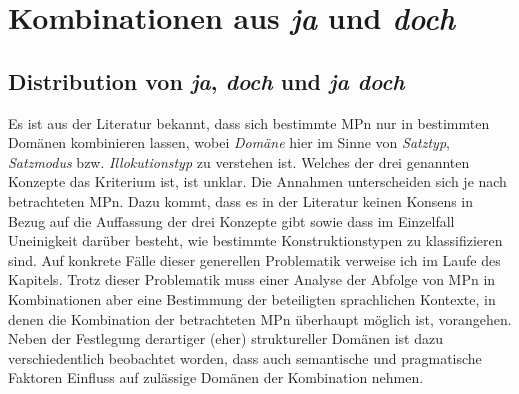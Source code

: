 \chapter{Kombinationen aus \textit{ja} und \textit{doch}}
\label{chapter:jud}
\section{Distribution von \textit{ja}, \textit{doch} und \textit{ja doch}}
\label{sec:distributionjd}
Es ist aus der Literatur bekannt, dass sich bestimmte MPn nur in bestimmten Domänen kombinieren lassen, wobei \textit{Domäne} hier im Sinne von \textit{Satztyp}, \textit{Satzmodus} bzw. \textit{Illokutionstyp} zu verstehen ist. Welches der drei genannten Konzepte das Kriterium ist, ist unklar. Die Annahmen unterscheiden sich je nach betrachte\-ten MPn. Dazu kommt, dass es in der Literatur keinen Konsens in Bezug auf die Auffassung der drei Konzepte gibt sowie dass im Einzelfall Uneinigkeit darüber besteht, wie bestimmte Konstruktionstypen zu klassifizieren sind. Auf konkrete Fälle dieser generellen Problematik verweise ich im Laufe des Kapitels. Trotz dieser Problematik muss einer Analyse der Abfolge von MPn in Kombinationen aber eine Bestimmung der beteiligten sprachlichen Kontexte, in denen die Kombination der betrachteten MPn überhaupt möglich ist, vorangehen. Neben der Festlegung derartiger (eher) struktureller Domänen ist dazu verschiedentlich beobachtet worden, dass auch semantische und pragmatische Faktoren Einfluss auf zulässige Domänen der Kombination nehmen. 

